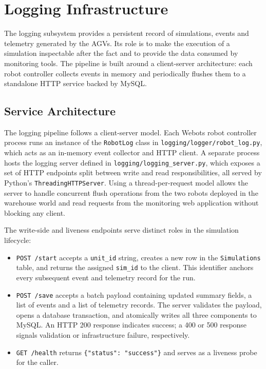 \section{Logging Infrastructure}
\label{sec:logger}

The logging subsystem provides a persistent record of simulations, events and telemetry generated by the AGVs. Its role is to make the execution of a simulation inspectable after the fact and to provide the data consumed by monitoring tools. The pipeline is built around a client-server architecture: each robot controller collects events in memory and periodically flushes them to a standalone HTTP service backed by MySQL.

\subsection{Service Architecture}
\label{sec:logger-architecture}

The logging pipeline follows a client-server model. Each Webots robot controller process runs an instance of the \texttt{RobotLog} class in \texttt{logging/logger/robot\_log.py}, which acts as an in-memory event collector and HTTP client. A separate process hosts the logging server defined in \texttt{logging/logging\_server.py}, which exposes a set of HTTP endpoints split between write and read responsibilities, all served by Python's \texttt{ThreadingHTTPServer}. Using a thread-per-request model allows the server to handle concurrent flush operations from the two robots deployed in the warehouse world and read requests from the monitoring web application without blocking any client.

The write-side and liveness endpoints serve distinct roles in the simulation lifecycle:

\begin{itemize}[itemsep=0.4ex, topsep=0.6ex]
  \item \texttt{POST /start} accepts a \texttt{unit\_id} string, creates a new row in the \texttt{Simulations} table, and returns the assigned \texttt{sim\_id} to the client. This identifier anchors every subsequent event and telemetry record for the run.
  \item \texttt{POST /save} accepts a batch payload containing updated summary fields, a list of events and a list of telemetry records. The server validates the payload, opens a database transaction, and atomically writes all three components to MySQL. An HTTP 200 response indicates success; a 400 or 500 response signals validation or infrastructure failure, respectively.
  \item \texttt{GET /health} returns \texttt{\{"status": "success"\}} and serves as a liveness probe for the caller.
\end{itemize}

